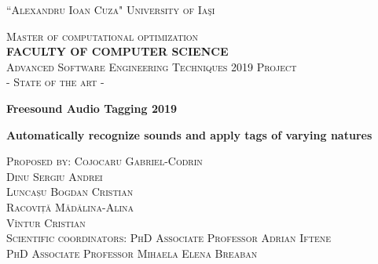 \documentclass[11pt, a4papper]{report}
\theoremstyle{proposition}
\begin{document}
\begin{center}

\vspace*{.06\textheight}
{\scshape\large {``Alexandru Ioan Cuza" University of Iaşi}\par}\vspace{0.3cm} 
\textsc{\large {Master of computational optimization}}\\[0.3cm] 
\textbf{\textsc{\large {FACULTY OF COMPUTER SCIENCE }}}\\[1.3cm] 


\vspace{0.4cm}
\textsc{\large {Advanced Software Engineering Techniques 2019 Project}}\\[0.1cm]
\textsc{\large { - State of the art - }}\\[2.7cm]

\vspace{0.6cm}
{\LARGE \bfseries {Freesound Audio Tagging 2019}\par}
\vspace{0.2cm} 
{\Large \bfseries {Automatically recognize sounds and apply tags of varying natures}\par}


\vspace{5.4cm}

\begin{center}
\textsc{\large Proposed by: Cojocaru Gabriel-Codrin}\\
\textsc{\large Dinu Sergiu Andrei} \\
\textsc{\large Luncașu Bogdan Cristian} \\
\textsc{\large Racoviță Mădălina-Alina} \\
\textsc{\large Vîntur Cristian} \\
[3.1cm]
\textsc{\large Scientific coordinators}: {\textsc{\large PhD Associate Professor Adrian Iftene}} \\
{\textsc{\large PhD Associate Professor Mihaela Elena Breaban}}
\end{center}
\end{center}
\newpage



\tableofcontents

\newpage
\end{document}
